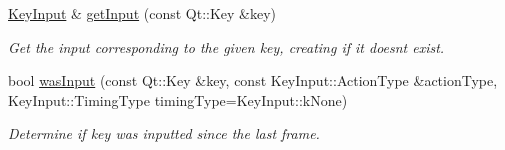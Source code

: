 \begin{Indent}
\begin{DoxyCompactItemize}
\mbox{\hyperlink{structrev_1_1_key_input}{Key\+Input}} \& \mbox{\hyperlink{classrev_1_1_key_handler_a04a9bdf70075dd1d3161d53d64f9996d}{get\+Input}} (const Qt\+::\+Key \&key)
\begin{DoxyCompactList}\small\item\em Get the input corresponding to the given key, creating if it doesn\textquotesingle{}t exist. \end{DoxyCompactList}\item 
\mbox{\label{classrev_1_1_key_handler_aeb8f9d51fa35b0c3dbe8a68148c5f077}} 
bool \mbox{\hyperlink{classrev_1_1_key_handler_aeb8f9d51fa35b0c3dbe8a68148c5f077}{was\+Input}} (const Qt\+::\+Key \&key, const Key\+Input\+::\+Action\+Type \&action\+Type, Key\+Input\+::\+Timing\+Type timing\+Type=Key\+Input\+::k\+None)
\begin{DoxyCompactList}\small\item\em Determine if key was inputted since the last frame. \end{DoxyCompactList}\end{DoxyCompactItemize}
\end{Indent}
